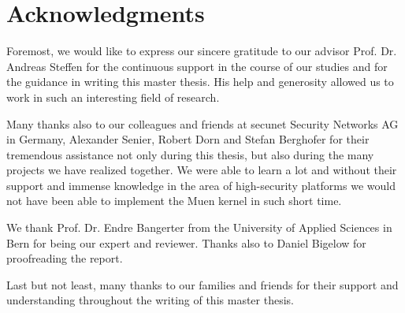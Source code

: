 \chapter*{Acknowledgments}
Foremost, we would like to express our sincere gratitude to our advisor Prof.
Dr. Andreas Steffen for the continuous support in the course of our studies and
for the guidance in writing this master thesis. His help and generosity allowed
us to work in such an interesting field of research.

Many thanks also to our colleagues and friends at secunet Security Networks AG
in Germany, Alexander Senier, Robert Dorn and Stefan Berghofer for their
tremendous assistance not only during this thesis, but also during the many
projects we have realized together. We were able to learn a lot and without
their support and immense knowledge in the area of high-security platforms we
would not have been able to implement the Muen kernel in such short time.

We thank Prof. Dr. Endre Bangerter from the University of Applied Sciences in
Bern for being our expert and reviewer. Thanks also to Daniel Bigelow for
proofreading the report.

Last but not least, many thanks to our families and friends for their support
and understanding throughout the writing of this master thesis.
